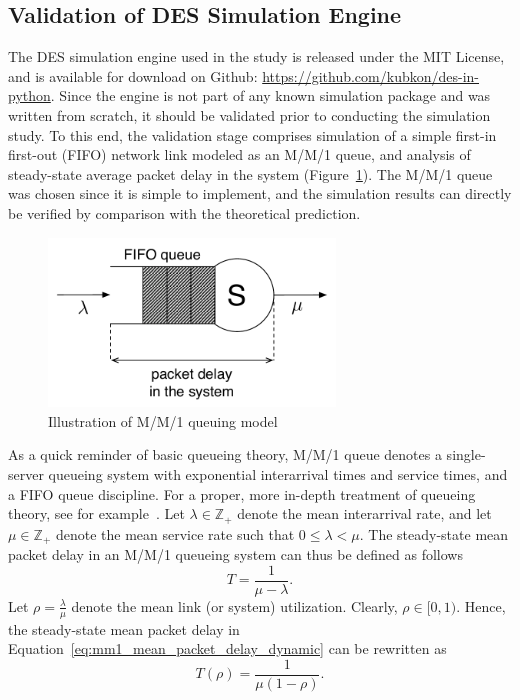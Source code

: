 \subsection{Validation of DES Simulation Engine} %
\label{sub:validation_of_des_simulation_engine_dynamic}
The DES simulation engine used in the study is released under the MIT License, and is available for download on Github: \url{https://github.com/kubkon/des-in-python}. Since the engine is not part of any known simulation package and was written from scratch, it should be validated prior to conducting the simulation study. To this end, the validation stage comprises simulation of a simple first-in first-out (FIFO) network link modeled as an M/M/1 queue, and analysis of steady-state average packet delay in the system (Figure~\ref{fig:mm1_queue_dynamic}). The M/M/1 queue was chosen since it is simple to implement, and the simulation results can directly be verified by comparison with the theoretical prediction.

\begin{figure}[h]
	\includegraphics[width=3in]{3/Figures/mm1_queue}
	\caption{Illustration of M/M/1 queuing model}
	\label{fig:mm1_queue_dynamic}
\end{figure}

As a quick reminder of basic queueing theory, M/M/1 queue denotes a single-server queueing system with exponential interarrival times and service times, and a FIFO queue discipline. For a proper, more in-depth treatment of queueing theory, see for example~\cite{CassandrasLafortune2008}. Let $\lambda\in\mathbb{Z}_+$ denote the mean interarrival rate, and let $\mu\in\mathbb{Z}_+$ denote the mean service rate such that $0 \le \lambda < \mu$. The steady-state mean packet delay in an M/M/1 queueing system can thus be defined as follows
\begin{equation}
	\label{eq:mm1_mean_packet_delay_dynamic}
	T = \frac{1}{\mu - \lambda}.
\end{equation}
Let $\rho = \displaystyle\frac{\lambda}{\mu}$ denote the mean link (or system) utilization. Clearly, $\rho\in [0,1)$. Hence, the steady-state mean packet delay in Equation~\eqref{eq:mm1_mean_packet_delay_dynamic} can be rewritten as
\begin{equation}
	\label{eq:mm1_mean_packet_delay_2_dynamic}
	T(\rho) = \frac{1}{\mu(1 - \rho)}.
\end{equation}

